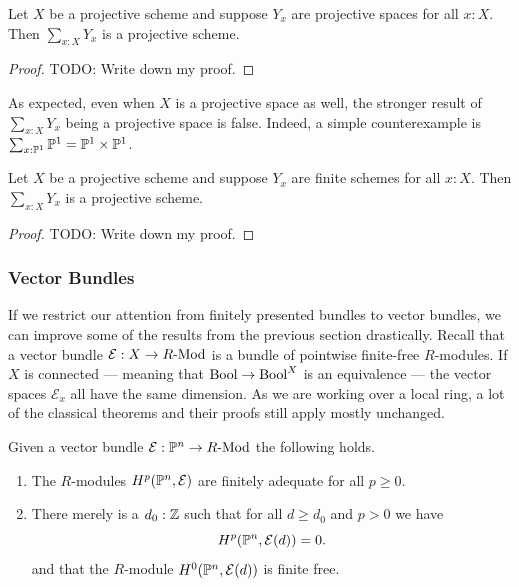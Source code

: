 \begin{corollary}
  Let $X$ be a projective scheme and suppose $Y_x$ are projective spaces for all $x:X$.
  Then $\sum_{x:X}Y_x$ is a projective scheme.
\end{corollary}

\begin{proof}
  {\color{red} TODO: Write down my proof.}
\end{proof}

As expected, even when $X$ is a projective space as well, the stronger result of $\sum_{x:X}Y_x$ being a projective space is false.
Indeed, a simple counterexample is $\sum_{x:\mathbb{P}^1} \mathbb{P}^1 = \mathbb{P}^1 \times \mathbb{P}^1$.

\begin{corollary}
  Let $X$ be a projective scheme and suppose $Y_x$ are finite schemes for all $x:X$.
  Then $\sum_{x:X}Y_x$ is a projective scheme.
\end{corollary}

\begin{proof}
  {\color{red}TODO: Write down my proof.}
\end{proof}






\subsubsection{Vector Bundles}

If we restrict our attention from finitely presented bundles to vector bundles, we can improve some of the results from the previous section drastically.
Recall that a vector bundle $\mathcal E : X \to R\text{-}\mathrm{Mod}$ is a bundle of pointwise finite-free $R$-modules.
If $X$ is connected --- meaning that $\mathrm{Bool} \to \mathrm{Bool}^X$ is an equivalence --- the vector spaces $\mathcal E_x$ all have the same dimension.
As we are working over a local ring, a lot of the classical theorems and their proofs still apply mostly unchanged.

\begin{proposition}
  \label{cohomology-of-twisted-vectorbundles-on-P^n}
  Given a vector bundle $\mathcal E : \mathbb{P}^n \to R\text{-}\mathrm{Mod}$ the following holds.
  \begin{enumerate}
    \item[i)] The $R$-modules $H^p(\mathbb{P}^n,\mathcal{E})$ are finitely adequate for all $p \geq 0$.
    \item[ii)] There merely is a $d_0 : \mathbb Z$ such that for all $d \geq d_0$ and $p > 0$  we have
      \[
        H^p(\mathbb{P}^n,\mathcal E(d)) = 0.
      \]
      and that the $R$-module $H^0(\mathbb{P}^n, \mathcal{E}(d))$ is finite free.
  \end{enumerate}
\end{proposition}

